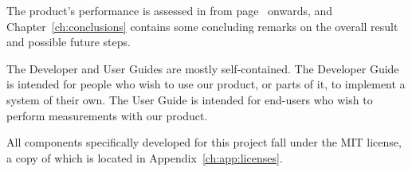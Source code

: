 The  product's  performance  is assessed  in  \emph{}
from page~\pageref{ch:verification}  onwards, and Chapter~\ref{ch:conclusions}
contains some  concluding remarks  on the overall  result and  possible future
steps.

The Developer and  User Guides are mostly  self-contained. The Developer Guide
is  intended for  people who  wish to  use  our product,  or parts  of it,  to
implement a system of their own. The  User Guide is intended for end-users who
wish to perform measurements with our product.

\enlargethispage{6ex}
\vspace{1ex}
\noindent All  components specifically developed  for this project  fall under
the MIT license, a copy of which is located in Appendix~\ref{ch:app:licenses}.

